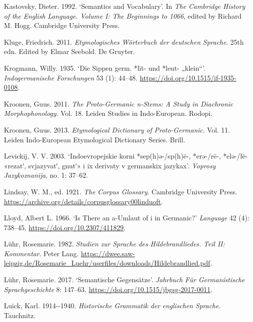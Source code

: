 \documentclass[
  british,
  a4paper,
]{article}
\newlength{\cslhangindent}
\newenvironment{CSLReferences}[2] %
 {\begin{list}{}{%
  \setlength{\itemindent}{0pt}
  \setlength{\leftmargin}{0pt}
  \setlength{\parsep}{0pt}
  \ifodd #1
   \setlength{\leftmargin}{\cslhangindent}
   \setlength{\itemindent}{-1\cslhangindent}
  \fi
  \setlength{\itemsep}{#2\baselineskip}}}
 {\end{list}}
\begin{document}
\begin{CSLReferences}{1}{1}
Kastovsky, Dieter. 1992. {`Semantics and Vocabulary'}. In \emph{The
{Cambridge} History of the {English} Language. Volume {I}: The
Beginnings to 1066}, edited by Richard M. Hogg. Cambridge University
Press.

Kluge, Friedrich. 2011. \emph{{Etymologisches W{ö}rterbuch der deutschen
Sprache}}. 25th edn. Edited by Elmar Seebold. De Gruyter.

Krogmann, Willy. 1935. {`{Die Sippen germ. *līt- und *leut- „klein``}'}.
\emph{Indogermanische Forschungen} 53 (1): 44--48.
\url{https://doi.org/10.1515/if-1935-0108}.

Kroonen, Guus. 2011. \emph{The {Proto-Germanic} n-Stems: A Study in
Diachronic Morphophonology}. Vol. 18. Leiden Studies in Indo-European.
Rodopi.

Kroonen, Guus. 2013. \emph{Etymological Dictionary of {Proto-Germanic}}.
Vol. 11. Leiden Indo-European Etymological Dictionary Series. Brill.

Levickij, V. V. 2003. {`{Indoevropejskie korni *sep(h)ə-/sp(h)ē-,
*erə-/rē-, *elə-/lē- «rezatʹ, svjazyvatʹ, gnutʹ» i ix derivaty v
germanskix jazykax}'}. \emph{Voprosy Jazykoznanija}, no. 1: 37--62.

Lindsay, W. M., ed. 1921. \emph{The {Corpus} Glossary}. Cambridge
University Press.
\url{https://archive.org/details/corpusglossary00linduoft}.

Lloyd, Albert L. 1966. {`Is There an {a-}Umlaut of {i} in {Germanic}?'}
\emph{Language} 42 (4): 738--45. \url{https://doi.org/10.2307/411829}.

Lühr, Rosemarie. 1982. \emph{{Studien zur Sprache des Hildebrandliedes.
Teil II: Kommentar}}. Peter Lang.
\url{https://dwee.saw-leipzig.de/Rosemarie_Luehr/userfiles/downloads/Hildebrandlied.pdf}.

Lühr, Rosemarie. 2017. {`{Semantische Gegensätze}'}. \emph{Jahrbuch Für
Germanistische Sprachgeschichte} 8: 147--63.
\url{https://doi.org/10.1515/jbgsg-2017-0011}.

Luick, Karl. 1914-\/-1940. \emph{{Historische Grammatik der englischen
Sprache}}. Tauchnitz.


\end{CSLReferences}
\end{document}
